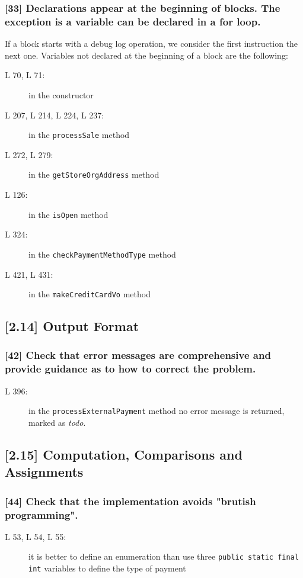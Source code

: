 \subsubsection*{[33] Declarations appear at the beginning of blocks. The exception is a variable can be declared in a for loop.}
If a block starts with a debug log operation, we consider the first instruction the next one. Variables not declared at the beginning of a block are the following:
\begin{description}
	\item[L 70, L 71:] in the constructor 
	\item[L 207, L 214, L 224, L 237:] in the {\tt processSale} method 
	\item[L 272, L 279:] in the {\tt getStoreOrgAddress} method 
	\item[L 126:] in the {\tt isOpen} method 
	\item[L 324:] in the {\tt checkPaymentMethodType} method  
	\item[L 421, L 431:] in the {\tt makeCreditCardVo} method 
\end{description}

\subsection*{[2.14] Output Format}
\subsubsection*{[42] Check that error messages are comprehensive and provide guidance as to how to correct the problem.}
\begin{description}
	\item[L 396:] in the {\tt processExternalPayment} method no error message is returned, marked as \emph{todo}.
\end{description}

\subsection*{[2.15] Computation, Comparisons and Assignments}
\subsubsection*{[44] Check that the implementation avoids "brutish programming".}
\begin{description}
	\item[L 53, L 54, L 55:] it is better to define an enumeration than use three {\tt public static final int} variables to define the type of payment
\end{description}

